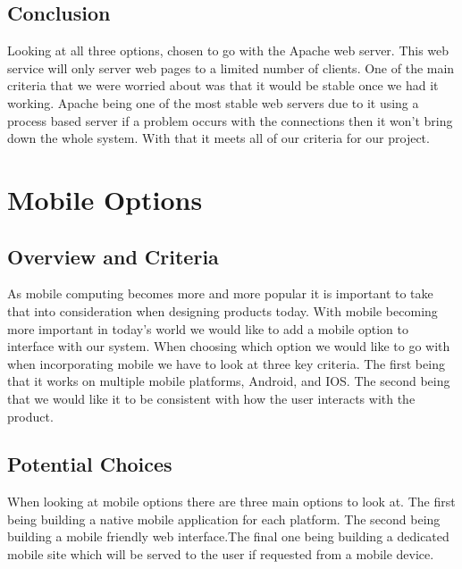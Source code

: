 	\subsection{Conclusion}
	Looking at all three options, chosen to go with the Apache web server.
	This web service will only server web pages to a limited number of clients.
	One of the main criteria that we were worried about was that
	it would be stable once we had it working. Apache being one of the most stable
	web servers due to it using a process based server if a problem occurs with
	the connections then it won’t bring down the whole system. With that it meets
	all of our criteria for our project.
\newpage
\section{Mobile Options}
	\subsection{Overview and Criteria}
	As mobile computing becomes more and more popular it is important to take
	that into consideration when designing products today. With mobile becoming
	more important in today's world we would like to add a mobile option to interface
	with our system. When choosing which option we would like to go with when
	incorporating mobile we have to look at three key criteria. The first being
	that it works on multiple mobile platforms, Android, and IOS. The second being
	that we would like it to be consistent with how the user interacts with the
	product.
	\subsection{Potential Choices}
	When looking at mobile options there are three main options to look at. The
	first being building a native mobile application for each platform. The second
	being building a mobile friendly web interface.The final one being building
	a dedicated mobile site which will be served to the user if requested from
	a mobile device.
